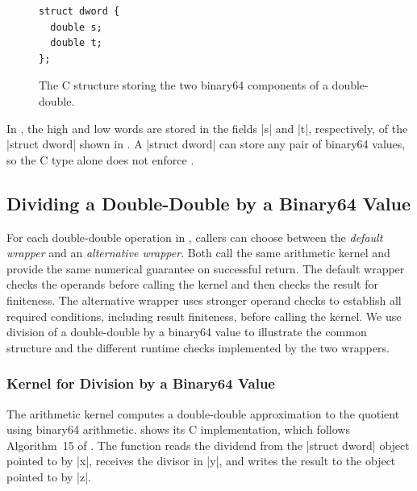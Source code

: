 \begin{figure}[t]
  \begin{sectiontwocpanel}
  \begin{lstlisting}[style=sectiontwoc]
struct dword {
  double s;
  double t;
};
\end{lstlisting}
  \end{sectiontwocpanel}
  \caption{The C structure storing the two binary64 components of a
  double-double.}
  \label{fig:dword-struct}
\end{figure}

In \FenceDD{}, the high and low words are stored in the fields
\ccode|s| and \ccode|t|, respectively, of the \ccode|struct dword| shown
in . A \ccode|struct dword| can store any pair of
binary64 values, so the C type alone does not enforce
.

\subsection{Dividing a Double-Double by a Binary64 Value}
\label{sec:overview-division}

For each double-double operation in \FenceDD{}, callers can choose
between the \emph{default wrapper} and an \emph{alternative wrapper}.
Both call the same arithmetic kernel and provide the same numerical
guarantee on successful return. The default wrapper checks the operands
before calling the kernel and then checks the result for finiteness.
The alternative wrapper uses stronger operand checks to establish all
required conditions, including result finiteness, before calling the
kernel. We use division of a double-double by a binary64 value to 
illustrate the common structure and the different runtime checks 
implemented by the two wrappers.

\subsubsection{Kernel for Division by a Binary64 Value}
\label{sec:overview-division-kernel}

The arithmetic kernel computes a double-double approximation to the quotient
using binary64 arithmetic.  shows its C
implementation, which follows Algorithm~15 of \citet{Joldes2017}. The function
reads the dividend from the
\ccode|struct dword| object pointed to by \ccode|x|, receives the divisor in
\ccode|y|, and writes the result to the object pointed to by \ccode|z|.

